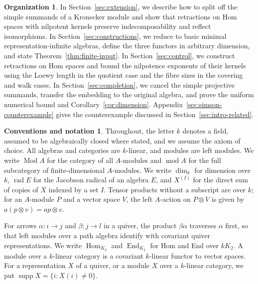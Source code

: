 \documentclass[a4paper,reqno,10pt]{amsart}
\theoremstyle{definition}
\newtheorem*{organization}{Organization}
\newtheorem*{conventions}{Conventions and notation}
\DeclareMathOperator{\Hom}{Hom}
\DeclareMathOperator{\End}{End}
\DeclareMathOperator{\rad}{rad}
\DeclareMathOperator{\supp}{supp}
\DeclareMathOperator{\Mod}{Mod}
\DeclareMathOperator{\md}{mod}
\newcommand{\dm}{\dim_k}
\numberwithin{equation}{section}
\begin{document}
\begin{organization}
In Section~\ref{sec:extension}, we describe how to split off the simple
summands of a Kronecker module and show that retractions on Hom spaces with nilpotent
kernels preserve indecomposability and reflect isomorphisms. In Section~\ref{sec:constructions}, we
reduce to basic minimal representation-infinite algebras, define the three functors in arbitrary dimension, and state
Theorem~\ref{thm:finite-input}. In Section~\ref{sec:control}, we construct
retractions on Hom spaces and bound the nilpotence exponents of their kernels using the Loewy length in the quotient
case and the fibre sizes in the covering and walk cases.
In Section~\ref{sec:completion}, we cancel the simple projective summands, transfer the
embedding to the original algebra, and prove the uniform numerical bound and
Corollary~\ref{cor:dimension}. Appendix~\ref{sec:simson-counterexample} gives
the counterexample discussed in Section~\ref{sec:intro-related}.
\end{organization}
\begin{conventions}
Throughout, the letter $k$ denotes a field, assumed to be algebraically closed where stated, and we assume the axiom of choice.
All algebras and categories are $k$-linear, and modules are left modules.
We write $\Mod A$ for the category of all $A$-modules and $\md A$ for the full subcategory of
finite-dimensional $A$-modules. We write $\dm$ for dimension over $k$, $\rad E$ for the Jacobson radical
of an algebra $E$, and $X^{(I)}$ for the direct sum of copies of $X$ indexed by
a set $I$. Tensor products without a subscript are over $k$; for an $A$-module $P$ and a vector
space $V$, the left $A$-action on $P\otimes V$ is given by $a(p\otimes v)=ap\otimes v$.

For arrows $\alpha:i\to j$ and $\beta:j\to l$ in a quiver,
the product $\beta\alpha$ traverses $\alpha$ first, so that left modules over
a path algebra identify with covariant quiver representations.
We write $\Hom_{K_2}$ and $\End_{K_2}$ for Hom and End
over $kK_2$. A module over a $k$-linear category is a covariant $k$-linear
functor to vector spaces. For a representation $X$ of a quiver, or a
module $X$ over a $k$-linear category, we put $\supp X=\{i:X(i)\ne0\}$.
\end{conventions}
\end{document}
